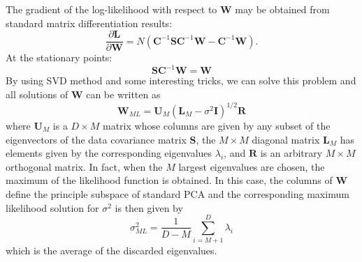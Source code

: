 \documentclass{article}
\begin{document}
	The gradient of the log-likelihood with respect to $\mathbf{W}$ may be obtained from standard matrix differentiation results:
	\begin{equation}
	\frac{\partial{\mathbf{L}}}{\partial{\mathbf{W}}} = N\left(\mathbf{C}^{-1}\mathbf{S}\mathbf{C}^{-1}\mathbf{W}-\mathbf{C}^{-1}\mathbf{W}\right).
	\end{equation}
	At the stationary points:
	\begin{equation}
	\mathbf{S}\mathbf{C}^{-1}\mathbf{W}=\mathbf{W}
	\end{equation}
	By using SVD method and some interesting tricks, we can solve this problem and all solutions of $\mathbf{W}$ can be written as
	\begin{equation}
	\mathbf{W}_{ML}=\mathbf{U}_M\left(\mathbf{L}_M-\sigma^2\mathbf{I}\right)^{1/2}\mathbf{R}
	\end{equation}
	where $\mathbf{U}_M$ is a $D \times M$ matrix whose columns are given by any subset of the eigenvectors of the data covariance matrix $\mathbf{S}$, the $M \times M$ diagonal matrix $\mathbf{L}_M$ has elements given by the corresponding eigenvalues $\lambda_i$, and $\mathbf{R}$ is an arbitrary $M \times M$ orthogonal matrix. 
	In fact, when the $M$ largest eigenvalues are chosen, the maximum of the likelihood function is obtained. In this case, the columns of $\mathbf{W}$ define the principle subspace of standard PCA and the corresponding maximum likelihood solution for $\sigma^2$ is then given by
	\begin{equation}
	\sigma^2_{ML}=\frac{1}{D-M}\sum\limits^{D}_{i=M+1}\lambda_i
	\end{equation}
	which is the average of the discarded eigenvalues. 
\end{document}

